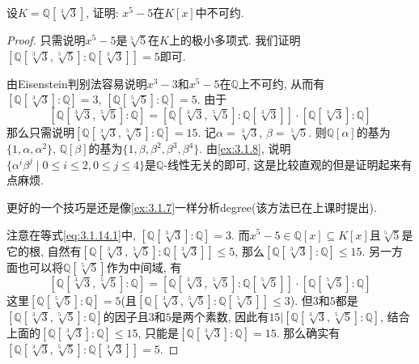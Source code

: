 \begin{problem}\label{ex:3.1.14}
    设$K = \mathbb{Q}[\sqrt[3]{3}]$, 证明: $x^5 - 5$在$K[x]$中不可约.
\end{problem}

\begin{proof}
    只需说明$x^5 - 5$是$\sqrt[5]{5}$在$K$上的极小多项式. 我们证明\\$\left[\mathbb{Q}[\sqrt[3]{3}, \sqrt[5]{5}]:\mathbb{Q}[\sqrt[3]{3}]\right] = 5$即可.

    由Eisenstein判别法容易说明$x^3 - 3$和$x^5 - 5$在$\mathbb{Q}$上不可约, 从而有$\left[\mathbb{Q}[\sqrt[3]{3}]:\mathbb{Q}\right] = 3$, $\left[\mathbb{Q}[\sqrt[5]{5}]:\mathbb{Q}\right] = 5$. 由于
    \begin{equation}
        \left[\mathbb{Q}[\sqrt[3]{3}, \sqrt[5]{5}]:\mathbb{Q}\right] = \left[\mathbb{Q}[\sqrt[3]{3}, \sqrt[5]{5}]:\mathbb{Q}[\sqrt[3]{3}]\right] \cdot \left[\mathbb{Q}[\sqrt[3]{3}]:\mathbb{Q}\right]
        \tag{1}
        \label{eq:3.1.14.1}
    \end{equation}
    那么只需说明$\left[\mathbb{Q}[\sqrt[3]{3}, \sqrt[5]{5}]:\mathbb{Q}\right] = 15$. 记$\alpha = \sqrt[3]{3}$, $\beta = \sqrt[5]{5}$. 则$\mathbb{Q}[\alpha]$的基为$\{1, \alpha, \alpha^2\}$, $\mathbb{Q}[\beta]$的基为$\{1, \beta, \beta^2, \beta^3, \beta^4\}$. 由\ref{ex:3.1.8}, 说明$\{\alpha^i\beta^j \mid 0 \leqslant i \leqslant 2, 0 \leqslant j \leqslant 4\}$是$\mathbb{Q}$-线性无关的即可, 这是比较直观的但是证明起来有点麻烦.

    更好的一个技巧是还是像\ref{ex:3.1.7}一样分析degree(该方法已在上课时提出).

    注意在等式\eqref{eq:3.1.14.1}中, $\left[\mathbb{Q}[\sqrt[3]{3}]:\mathbb{Q}\right] = 3$. 而$x^5 - 5 \in \mathbb{Q}[x] \subseteq K[x]$且$\sqrt[5]{5}$是它的根, 自然有$\left[\mathbb{Q}[\sqrt[3]{3}, \sqrt[5]{5}]:\mathbb{Q}[\sqrt[3]{3}]\right] \leqslant 5$, 那么$\left[\mathbb{Q}[\sqrt[3]{3}]:\mathbb{Q}\right] \leqslant 15$. 另一方面也可以将$\mathbb{Q}[\sqrt[5]{5}]$作为中间域, 有
    \begin{equation}
        \left[\mathbb{Q}[\sqrt[3]{3}, \sqrt[5]{5}]:\mathbb{Q}\right] = \left[\mathbb{Q}[\sqrt[3]{3}, \sqrt[5]{5}]:\mathbb{Q}[\sqrt[5]{5}]\right] \cdot \left[\mathbb{Q}[\sqrt[5]{5}]:\mathbb{Q}\right]
        \tag{2}
        \label{eq:3.1.14.2}
    \end{equation}
    这里$\left[\mathbb{Q}[\sqrt[5]{5}]:\mathbb{Q}\right] = 5$(且$\left[\mathbb{Q}[\sqrt[3]{3}, \sqrt[5]{5}]:\mathbb{Q}[\sqrt[5]{5}]\right] \leqslant 3$). 但$3$和$5$都是$\left[\mathbb{Q}[\sqrt[3]{3}, \sqrt[5]{5}]:\mathbb{Q}\right]$的因子且$3$和$5$是两个素数, 因此有$15 \Big| \left[\mathbb{Q}[\sqrt[3]{3}, \sqrt[5]{5}]:\mathbb{Q}\right]$, 结合上面的$\left[\mathbb{Q}[\sqrt[3]{3}]:\mathbb{Q}\right] \leqslant 15$, 只能是$\left[\mathbb{Q}[\sqrt[3]{3}]:\mathbb{Q}\right] = 15$. 那么确实有$\left[\mathbb{Q}[\sqrt[3]{3}, \sqrt[5]{5}]:\mathbb{Q}[\sqrt[3]{3}]\right] = 5$.
\end{proof}

